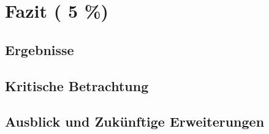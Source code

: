 \chapter{Fazit ( 5 \%)}
\section{Ergebnisse}
\section{Kritische Betrachtung}
\section{Ausblick und Zukünftige Erweiterungen}
